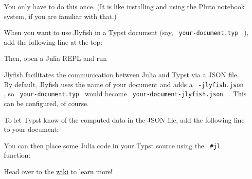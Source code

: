 You only have to do this once. (It is like installing and using the
Pluto notebook system, if you are familiar with that.)

When you want to use Jlyfish in a Typst document (say,
\texttt{\ your-document.typ\ } ), add the following line at the top:

\begin{Shaded}
\begin{Highlighting}[]
\end{Highlighting}
\end{Shaded}

Then, open a Julia REPL and run

\begin{Shaded}
\begin{Highlighting}[]

\end{Highlighting}
\end{Shaded}

Jlyfish facilitates the communication between Julia and Typst via a JSON
file. By default, Jlyfish uses the name of your document and adds a
\texttt{\ -jlyfish.json\ } , so \texttt{\ your-document.typ\ } would
become \texttt{\ your-document-jlyfish.json\ } . This can be configured,
of course.

To let Typst know of the computed data in the JSON file, add the
following line to your document:

\begin{Shaded}
\begin{Highlighting}[]
\end{Highlighting}
\end{Shaded}

You can then place some Julia code in your Typst source using the
\texttt{\ \#jl\ } function:

\begin{Shaded}
\begin{Highlighting}[]
\end{Highlighting}
\end{Shaded}

Head over to the
\href{https://github.com/andreasKroepelin/TypstJlyfish.jl/wiki}{wiki} to
learn more!

